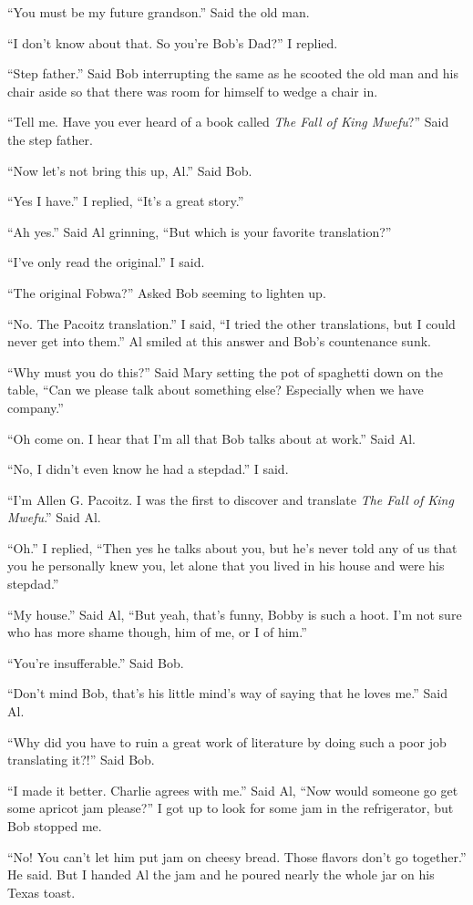 ``You must be my future grandson.'' Said the old man.

``I don't know about that. So you're Bob's Dad?'' I replied.

``Step father.'' Said Bob interrupting the same as he scooted the old man and his chair aside so that there was room for himself to wedge a chair in.

``Tell me. Have you ever heard of a book called \emph{The Fall of King Mwefu}?'' Said the step father.

``Now let's not bring this up, Al.'' Said Bob.

``Yes I have.'' I replied, ``It's a great story.''

``Ah yes.'' Said Al grinning, ``But which is your favorite translation?''

``I've only read the original.'' I said.

``The original Fobwa?'' Asked Bob seeming to lighten up.

``No. The Pacoitz translation.'' I said, ``I tried the other translations, but I could never get into them.'' Al smiled at this answer and Bob's countenance sunk.

``Why must you do this?'' Said Mary setting the pot of spaghetti down on the table, ``Can we please talk about something else? Especially when we have company.''

``Oh come on. I hear that I'm all that Bob talks about at work.'' Said Al.

``No, I didn't even know he had a stepdad.'' I said.

``I'm Allen G. Pacoitz. I was the first to discover and translate \emph{The Fall of King Mwefu}.'' Said Al.

``Oh.'' I replied, ``Then yes he talks about you, but he's never told any of us that you he personally knew you, let alone that you lived in his house and were his stepdad.''

``My house.'' Said Al, ``But yeah, that's funny, Bobby is such a hoot. I'm not sure who has more shame though, him of me, or I of him.''

``You're insufferable.'' Said Bob.

``Don't mind Bob, that's his little mind's way of saying that he loves me.'' Said Al.

``Why did you have to ruin a great work of literature by doing such a poor job translating it?!'' Said Bob.

``I made it better. Charlie agrees with me.'' Said Al, ``Now would someone go get some apricot jam please?'' I got up to look for some jam in the refrigerator, but Bob stopped me.

``No! You can't let him put jam on cheesy bread. Those flavors don't go together.'' He said. But I handed Al the jam and he poured nearly the whole jar on his Texas toast.

